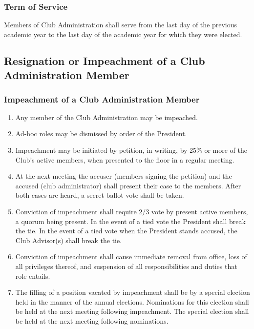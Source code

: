 \documentclass[english,11pt]{article}
\begin{document}
\subsubsection{Term of Service} \label{subsect:cadmin:selection:terms}
Members of Club Administration shall serve from the last day of the previous academic year to the last day of the academic year for which they were elected.

\subsection{Resignation or Impeachment of a Club Administration Member} \label{sect:cadmin:removal}
\subsubsection{Impeachment of a Club Administration Member} \label{subsect:cadmin:removal:impeachment}

\begin{enumerate}[label=\alph*.]
\item Any member of the Club Administration may be impeached.
\item Ad-hoc roles may be dismissed by order of the President.
\item Impeachment may be initiated by petition, in writing, by 25\% or more of the Club’s active members, when presented to the floor in a regular meeting.
\item At the next meeting the accuser (members signing the petition) and the accused (club administrator) shall present their case to the members.
      After both cases are heard, a secret ballot vote shall be taken.
\item Conviction of impeachment shall require 2/3 vote by present active members, a quorum being present.
      In the event of a tied vote the President shall break the tie.
      In the event of a tied vote when the President stands accused, the Club Advisor(s) shall break the tie.
\item Conviction of impeachment shall cause immediate removal from office, loss of all privileges thereof, and suspension of all responsibilities and duties that role entails.
\item The filling of a position vacated by impeachment shall be by a special election held in the manner of the annual elections.
      Nominations for this election shall be held at the next meeting following impeachment.
      The special election shall be held at the next meeting following nominations.
\end{enumerate}
\end{document}
